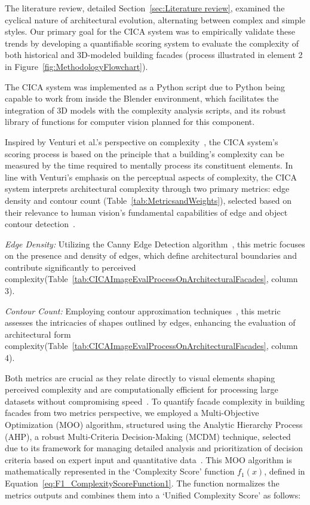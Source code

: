 

The literature review, detailed Section~\ref{sec:Literature review}, examined the cyclical nature of architectural evolution, alternating between complex and simple styles.
Our primary goal for the CICA system was to empirically validate these trends by developing a quantifiable scoring system to evaluate the complexity of both historical and 3D-modeled building facades (process illustrated in element 2 in Figure~\ref{fig:MethodologyFlowchart}).

The CICA system was implemented as a Python script due to Python being capable to work from inside the Blender environment, which facilitates the integration of 3D models with the complexity analysis scripts, and its robust library of functions for computer vision planned for this component.

Inspired by Venturi et al.'s perspective on complexity~\cite{Venturi1977}, the CICA system's scoring process is based on the principle that a building's complexity can be measured by the time required to mentally process its constituent elements.
In line with Venturi's emphasis on the perceptual aspects of complexity, the CICA system interprets architectural complexity through two primary metrics: edge density and contour count (Table~\ref{tab:MetricsandWeights}), selected based on their relevance to human vision's fundamental capabilities of edge and object contour detection~\cite{Yang2022}.

\textit{Edge Density:} Utilizing the Canny Edge Detection algorithm~\cite{EdgeOpenCV2023}, this metric focuses on the presence and density of edges, which define architectural boundaries and contribute significantly to perceived complexity(Table~\ref{tab:CICAImageEvalProcessOnArchitecturalFacades}, column 3).

\textit{Contour Count:} Employing contour approximation techniques~\cite{ContourOpenCV2023}, this metric assesses the intricacies of shapes outlined by edges, enhancing the evaluation of architectural form complexity(Table~\ref{tab:CICAImageEvalProcessOnArchitecturalFacades}, column 4).

Both metrics are crucial as they relate directly to visual elements shaping perceived complexity and are computationally efficient for processing large datasets without compromising speed~\cite{Yang2022}.
To quantify facade complexity in building facades from two metrics perspective, we employed a Multi-Objective Optimization (MOO) algorithm, structured using the Analytic Hierarchy Process (AHP), a robust Multi-Criteria Decision-Making (MCDM) technique, selected due to its framework for managing detailed analysis and prioritization of decision criteria based on expert input and quantitative data~\cite{Taherdoost2023}.
This MOO algorithm is mathematically represented in the `Complexity Score' function \(f_1(x)\), defined in Equation~\ref{eq:F1_ComplexityScoreFunction1}.
The function normalizes the metrics outputs and combines them into a `Unified Complexity Score' as follows:


